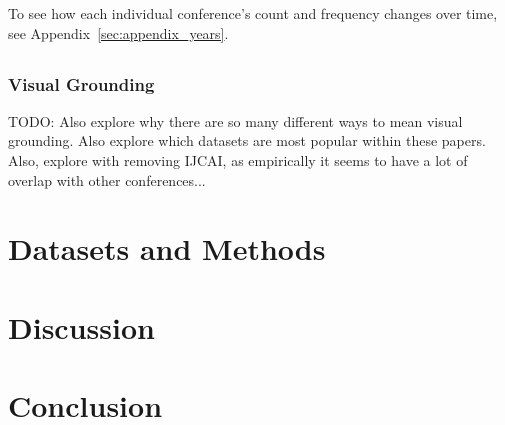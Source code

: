 \documentclass[11pt]{article}
\begin{document}
To see how each individual conference's count and frequency changes over time, see Appendix~\ref{sec:appendix_years}.

\subsection{}

\subsubsection{Visual Grounding}
TODO: Also explore why there are so many different ways to mean visual grounding. Also explore which datasets are most popular within these papers. Also, explore with removing IJCAI, as empirically it seems to have a lot of overlap with other conferences...

\section{Datasets and Methods}

\section{Discussion}

\section{Conclusion}




\end{document}
